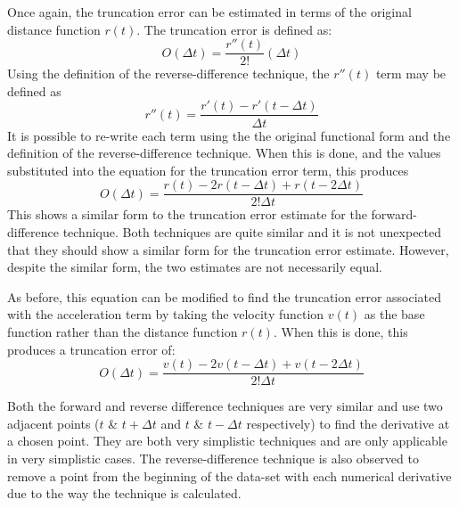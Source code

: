 Once again, the truncation error can be estimated in terms of the original distance function $r(t)$. The truncation error is defined as:
\begin{equation}
O(\Delta t) = \frac{r''(t)}{2!}(\Delta t)
\end{equation}
Using the definition of the reverse-difference technique, the $r''(t)$ term may be defined as
\begin{equation}
r''(t) = \frac{r'(t ) - r'(t - \Delta t)}{\Delta t}
\end{equation}
It is possible to re-write each term using the the original functional form and the definition of the reverse-difference technique. When this is done, and the values substituted into the equation for the truncation error term, this produces
\begin{equation}
O(\Delta t) = \frac{r(t) - 2r(t - \Delta t) + r(t - 2\Delta t)}{2!\Delta t}
\end{equation}
This shows a similar form to the truncation error estimate for the forward-difference technique. Both techniques are quite similar and it is not unexpected that they should show a similar form for the truncation error estimate. However, despite the similar form, the two estimates are not necessarily equal.

As before, this equation can be modified to find the truncation error associated with the acceleration term by taking the velocity function $v(t)$ as the base function rather than the distance function $r(t)$. When this is done, this produces a truncation error of:
\begin{equation}
O(\Delta t) = \frac{v(t) - 2v(t - \Delta t) + v(t - 2\Delta t)}{2!\Delta t}
\end{equation}

Both the forward and reverse difference techniques are very similar and use two adjacent points ($t$ \& $t+\Delta t$ and $t$ \& $t-\Delta t$ respectively) to find the derivative at a chosen point. They are both very simplistic techniques and are only applicable in very simplistic cases. The reverse-difference technique is also observed to remove a point from the beginning of the data-set with each numerical derivative due to the way the technique is calculated. 

